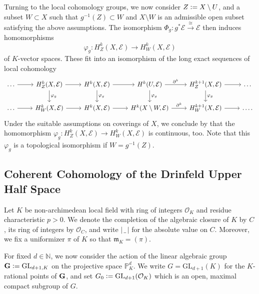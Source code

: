 \documentclass[a4paper, reqno, 10pt]{amsart}
\theoremstyle{definition}
\numberwithin{equation}{section}
\newcommand{\abs}[1]{{\lvert{#1}\rvert}}
\newcommand{\blank}{{\,\_\,}}
\newcommand{\defeq}{\vcentcolon=}
\newcommand{\GL}{{\mathrm{GL}}}
\newcommand{\lra}{\longrightarrow}
\newcommand{\ra}{\rightarrow}
\newcommand{\BN}{{\mathbb {N}}}
\newcommand{\BP}{{\mathbb {P}}}
\newcommand{\CE}{{\mathcal {E}}}
\newcommand{\CO}{{\mathcal {O}}}
\newcommand{\bG}{{\mathrm{\bf G}}}
\newcommand{\Fm}{{\mathfrak {m}}}
\newcommand{\unif}{{\pi}}
\begin{document}
Turning to the local cohomology groups, we now consider $Z\defeq X \setminus U$, and a subset $W \subset X$ such that $g^{-1} (Z) \subset W$ and $X\setminus W$ is an admissible open subset satisfying the above assumptions.
The isomorphism $\Phi_g\colon g^\ast \CE \xrightarrow{\cong} \CE$ then induces homomorphisms
\begin{equation}\label{Eq 2 - Group action homomorphism for local cohomology}
	\varphi_g\colon H_{Z}^k (X, \CE) \lra H_{W}^k (X,\CE)
\end{equation}
of $K$-vector spaces.
These fit into an isomorphism of the long exact sequences of local cohomology
\begin{equation*}
	\begin{tikzcd}
		\ldots \ar[r] & H^k_{Z}(X,\CE) \ar[r]\ar[d, "\varphi_g"] & H^k(X,\CE) \ar[r] \ar[d, "\varphi_g"] & H^k(U,\CE) \ar[r, "\partial^k"] \ar[d, "\varphi_g"] & H^{k+1}_{Z} (X,\CE) \ar[r]\ar[d, "\varphi_g"] & \ldots \\
		\ldots \ar[r] & H^k_{ W}(X,\CE) \ar[r] & H^k(X,\CE) \ar[r]  & H^k(X \setminus W,\CE) \ar[r, "\partial^k"]  & H^{k+1}_{W} (X,\CE) \ar[r] & \ldots .
	\end{tikzcd}
\end{equation*}
Under the suitable assumptions on coverings of $X$, we conclude by \cite[Lemma 5.1 (i)]{Schneider02NonArchFunctAna} that the homomorphism $\varphi_g\colon H_{Z}^k (X, \CE) \ra H_{W}^k (X,\CE)$ is continuous, too.
Note that this $\varphi_g$ is a topological isomorphism if $W=g^{-1}(Z)$.



\subsection{Coherent Cohomology of the Drinfeld Upper Half Space}\label{Sect 2 - Coherent Cohomology of the Drinfeld Upper Half Space}



Let $K$ be non-ar\-chi\-me\-dean local field with ring of integers $\CO_K$ and residue characteristic $p>0$.
We denote the completion of the algebraic closure of $K$ by $C$, its ring of integers by $\CO_C$, and write $\abs{\blank}$ for the absolute value on $C$.
Moreover, we fix a uniformizer $\unif$ of $K$ so that $\Fm_K = (\unif)$.


For fixed $d\in \BN$, we now consider the action of the linear algebraic group $\bG \defeq \GL_{d+1,K}$ on the projective space $\BP_K^d$.
We write $G = \GL_{d+1}(K)$ for the $K$-rational points of $\bG$, and set $G_0 \defeq \GL_{d+1}(\CO_K)$ which is an open, maximal compact subgroup of $G$.
\end{document}
